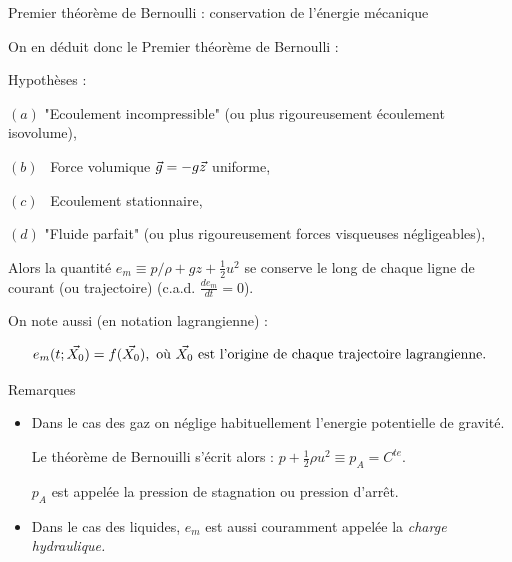 \begin{frame}{Premier théorème de Bernoulli : conservation de l'énergie mécanique}

\small

On en déduit donc le \textcolor{vert}{Premier théorème de Bernoulli} :
\medskip

Hypothèses : 

$(a)$ "Ecoulement incompressible" (ou plus rigoureusement écoulement isovolume),

$(b)$ \,  Force volumique $\vec{g} = - g \vec{z} $ uniforme,

$(c)$ \, Ecoulement stationnaire,

$(d)$ "Fluide parfait" (ou plus rigoureusement forces visqueuses négligeables),

\medskip

Alors la quantité 
$ e_m \equiv p/\rho  + g z + \frac{1}{2}  u^2$ se conserve le long de chaque ligne de courant (ou trajectoire) (c.a.d. $\frac{d e_m}{dt} = 0$). 

\medskip
\pause

On note aussi (en notation lagrangienne) : 

$$ 
e_m(t;\vec{X_0})  = f(\vec{X_0}) , \mbox{ où } \vec{X_0} \mbox{ est l'origine de chaque trajectoire lagrangienne.}
$$



\bigskip
\pause

Remarques 

\begin{itemize}


\item Dans le cas des gaz on néglige habituellement l'energie potentielle de gravité.

Le théorème de Bernouilli s'écrit alors : $p+ \frac{1}{2} \rho u^2 \equiv p_A = C^{te}$.

$p_A$ est appelée la pression de stagnation ou pression d'arrêt.
  \pause
\item Dans le cas des liquides,  $e_m$ est aussi couramment appelée la {\em charge hydraulique.}


\end{itemize}
\end{frame}
